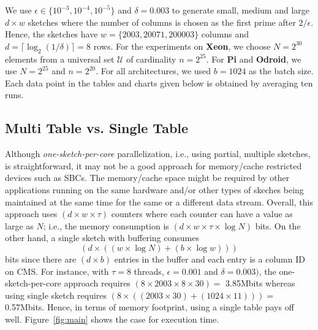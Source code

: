 \documentclass[runningheads]{llncs}
\begin{document}
We use $\epsilon \in \{10^{-3}, 10^{-4}, 10^{-5}\}$ and $\delta = 0.003$ to generate small, medium and large $d \times w$ sketches  where the number of columns is chosen as the first prime after $2/\epsilon$. Hence, the sketches have $w = \{2003, 20071, 200003\}$ columns and $d = \lceil \log_2(1/\delta) \rceil = 8$ rows. For the experiments on {\bf Xeon}, we choose $N = 2^{30}$ elements from a universal set $\mathcal{U}$ of cardinality $n = 2^{25}$. For {\bf Pi} and   {\bf Odroid}, we use $N = 2^{25}$ and $n = 2^{20}$. For all architectures, we used $b = 1024$ as the batch size. Each data point in the tables and charts given below is obtained by averaging ten runs. 

\subsection{Multi Table vs. Single Table}

Although {\em one-sketch-per-core} parallelization, i.e., using partial, multiple sketches, is straightforward, it may not be a good approach for memory/cache restricted devices such as SBCs. The memory/cache space might be required by other applications running on the same hardware and/or other types of skeches being maintained at the same time for the same or a different data stream. 
Overall, this approach uses $(d \times w \times \tau)$ counters
where each counter can have a value as large as $N$; i.e., the memory consumption is
$(d \times w \times \tau \times \log N)$ bits. On the other hand, a single sketch with buffering
consumes $$(d \times ((w \times \log N) + (b \times \log w)))$$ bits since there are $(d \times b)$ entries in the
buffer and each entry is a column ID on CMS. For instance, with $\tau = 8$ threads, $\epsilon = 0.001$ and $\delta = 0.003)$, the one-sketch-per-core approach requires $(8 \times 2003 \times 8 \times 30) =$ 3.85Mbits whereas using single sketch requires
$(8 \times ((2003 \times 30) + (1024 \times 11))) =$ 0.57Mbits. Hence, in terms of memory footprint, using a single table pays off well. Figure~\ref{fig:main} shows the case for execution time.
\end{document}
